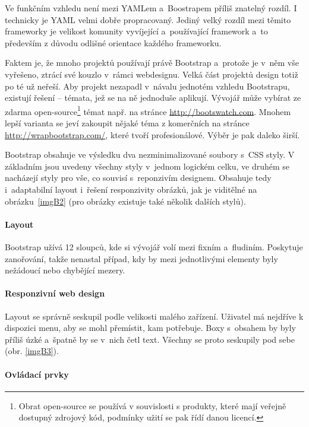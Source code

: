 \documentclass[thesis=B,czech]{FITthesis}[2012/06/26]
\begin{document}
Ve funkčním vzhledu není mezi YAMLem a~Boostrapem příliš znatelný rozdíl. I technicky je YAML velmi dobře propracovaný. Jediný velký rozdíl mezi těmito frameworky je velikost komunity vyvíjející a~používající framework a~to především z důvodu odlišné orientace každého frameworku.

Faktem je, že mnoho projektů používají právě Bootstrap a~protože je v~něm vše vyřešeno, ztrácí své kouzlo v~rámci webdesignu. Velká část projektů design totiž po té už neřeší. Aby projekt nezapadl v~návalu jednotém vzhledu Bootstrapu, existují řešení -- témata, jež se na ně jednoduše aplikují. Vývojář může vybírat ze zdarma open-source\footnote{Obrat open-source se používá v souvislosti s produkty, které mají veřejně dostupný zdrojový kód, podmínky užití se pak řídí danou licencí.} témat např. na stránce \url{http://bootswatch.com}. Mnohem lepší varianta se jeví zakoupit nějaké téma z komerčních na stránce \url{http://wrapbootstrap.com/}, které tvoří profesionálové. Výběr je pak daleko širší.

Bootstrap obsahuje ve výsledku dva nezminimalizované soubory s~CSS styly. V základním jsou uvedeny všechny styly v~jednom logickém celku, ve druhém se nacházejí styly pro vše, co souvisí s~reponzivím designem. Obsahuje tedy i~adaptabilní layout i~řešení responzivity obrázků, jak je viditělné na obrázku~\ref{imgB2} (pro obrázky existuje také několik dalších stylů).


\paragraph{Layout}

Bootstrap užívá 12 sloupců, kde si vývojář volí mezi fixním a~fludiním. Poskytuje zanořování, takže nenastal případ, kdy by mezi jednotlivými elementy byly nežádoucí nebo chybějící mezery. 

\paragraph{Responzivní web design}

Layout se správně seskupil podle velikosti malého zařízení. Uživatel má nejdříve k dispozici menu, aby se mohl přemístit, kam potřebuje. Boxy s~obsahem by byly příliš úzké a~špatně by se v~nich četl text. Všechny se proto seskupily pod sebe (obr. \ref{imgB3}).



\paragraph{Ovládací prvky}
\end{document}
